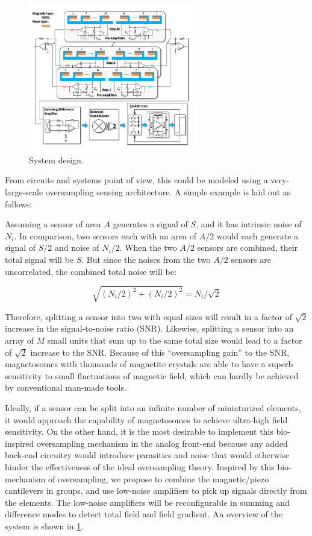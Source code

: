 \begin{figure}
\centering
\includegraphics[width=0.65\textwidth]{System}
\caption{System design.}
\label{fig:system}
\end{figure}

From circuits and systems point of view, this could be modeled using a very-large-scale oversampling sensing architecture. A simple example is laid out as follows: 

Assuming a sensor of area $A$ generates a signal of $S$, and it has intrinsic noise of $N_i$. In comparison, two sensors each with an area of $A/2$ would each generate a signal of $S/2$ and noise of $N_i/2$. When the two $A/2$ sensors are combined, their total signal will be $S$. But since the noises from the two $A/2$ sensors are uncorrelated, the combined total noise will be:

$$\sqrt{(N_i/2)^2+(N_i/2)^2} = N_i/\sqrt{2} $$

Therefore, splitting a sensor into two with equal sizes will result in a factor of $\sqrt{2}$ increase in the signal-to-noise ratio (SNR). Likewise, splitting a sensor into an array of $M$ small units that sum up to the same total size would lead to a factor of $\sqrt{2}$ increase to the SNR. Because of this “oversampling gain” to the SNR, magnetosomes with thousands of magnetite crystals are able to have a superb sensitivity to small fluctuations of magnetic field, which can hardly be achieved by conventional man-made tools. 

Ideally, if a sensor can be split into an infinite number of miniaturized elements, it would approach the capability of magnetosomes to achieve ultra-high field sensitivity. On the other hand, it is the most desirable to implement this bio-inspired oversampling mechanism in the analog front-end because any added back-end circuitry would introduce parasitics and noise that would otherwise hinder the effectiveness of the ideal oversampling theory. Inspired by this bio-mechanism of oversampling, we propose to combine the magnetic/piezo cantilevers in groups, and use low-noise amplifiers to pick up signals directly from the elements. The low-noise amplifiers will be reconfigurable in summing and difference modes to detect total field and field gradient. An overview of the system is shown in \ref{fig:system}.

